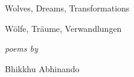 \documentclass[12pt,oneside,final]{memoir}
\begin{document}
\raggedleft

{\LARGE
Wolves, Dreams, Transformations
\vspace*{0.3em}

{\color[gray]{0.5}Wölfe, Träume, Verwandlungen}
}

\vfill

{\Large
{\color[gray]{0.5}\textit{poems by}}
\vspace*{0.3em}

Bhikkhu Abhinando
}
\end{document}
